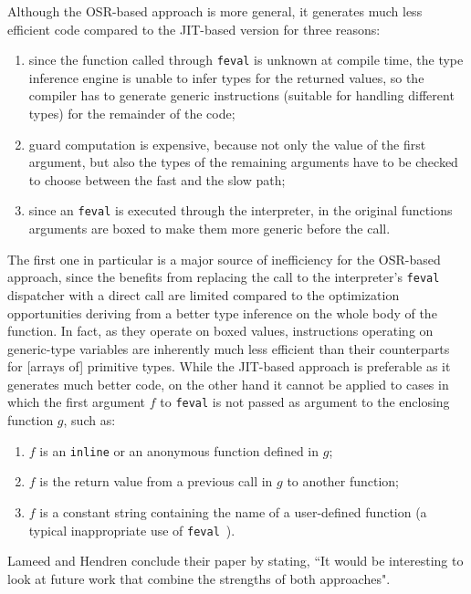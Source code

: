 Although the OSR-based approach is more general, it generates much less efficient code compared to the JIT-based version for three reasons:
\begin{enumerate}
\item since the function called through {\tt feval} is unknown at compile time, the type inference engine is unable to infer types for the returned values, so the compiler has to generate generic instructions (suitable for handling different types) for the remainder of the code;
\item guard computation is expensive, because not only the value of the first argument, but also the types of the remaining arguments have to be checked to choose between the fast and the slow path;
\item since an {\tt feval} is executed through the interpreter, in the original functions arguments are boxed to make them more generic before the call.
\end{enumerate}

The first one in particular is a major source of inefficiency for the OSR-based approach, since the benefits from replacing the call to the interpreter's {\tt feval} dispatcher with a direct call are limited compared to the optimization opportunities deriving from a better type inference on the whole body of the function. In fact, as they operate on boxed values, instructions operating on generic-type variables are inherently much less efficient than their counterparts for [arrays of] primitive types. While the JIT-based approach is preferable as it generates much better code, on the other hand it cannot be applied to cases in which the first argument $f$ to {\tt feval} is not passed as argument to the enclosing function $g$, such as:
\begin{enumerate}
\item $f$ is an {\tt inline} or an anonymous function defined in $g$;
\item $f$ is the return value from a previous call in $g$ to another function;
\item $f$ is a constant string containing the name of a user-defined function (a typical inappropriate use of {\tt feval}~\cite{radpour2013refactoring}).
\end{enumerate}
 
Lameed and Hendren conclude their paper by stating, ``It would be interesting to look at future work that combine the
strengths of both approaches".
  
  